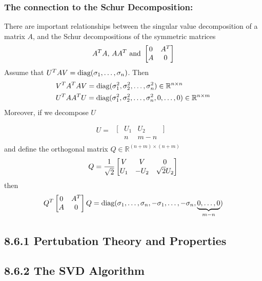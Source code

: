 \subsubsection*{The connection to the Schur Decomposition:} %

There are important relationships between the singular value decomposition of a matrix
$A$, and the Schur decompositions of the symmetric matrices 
\begin{equation}
	A^TA,\, AA^T \text{ and } \left[\begin{matrix} 0 & A^T \\ A & 0 \end{matrix}\right]
\end{equation}
Assume that $U^TAV=\text{diag}{(}\sigma_1,\dots,\sigma_n)$. Then
\begin{align}
	&V^TA^TAV = \text{diag}{(}\sigma_1^2,\sigma_2^2,\dots,\sigma_n^2)\in\mathbb R^{n\times n}
	\label{eq861}\\
	&U^TAA^TU = \text{diag}{(}\sigma_1^2,\sigma_2^2,\dots,\sigma_n^2,0,\dots,0)\in\mathbb R^{n\times m}
\end{align}
Moreover, if we decompose $U$
\begin{align}
	U= 
\begin{matrix}
	\\
	\begin{matrix}
	[ & U_1 & U_2 & ]\\
	  &	n & m-n &
	\end{matrix}
\end{matrix}
\end{align}
and define the orthogonal matrix $Q\in\mathbb R^{(n+m)\times(n+m)}$
\begin{align}
	Q=\frac1{\sqrt 2}\left[\begin{matrix} V & V & 0 \\ U_1 & -U_2 & \sqrt2U_2 \end{matrix}\right]
\end{align}
then
\begin{align}
	Q^T\left[\begin{matrix} 0 & A^T \\ A & 0  \end{matrix}\right] Q 
	= \text{diag}{(}\sigma_1,\dots,\sigma_n,-\sigma_1,\dots,-\sigma_n,\underbrace{0,\dots,0}_{m-n})
\end{align}


\subsection*{8.6.1 Pertubation Theory and Properties}

\subsection*{8.6.2 The SVD Algorithm} %


